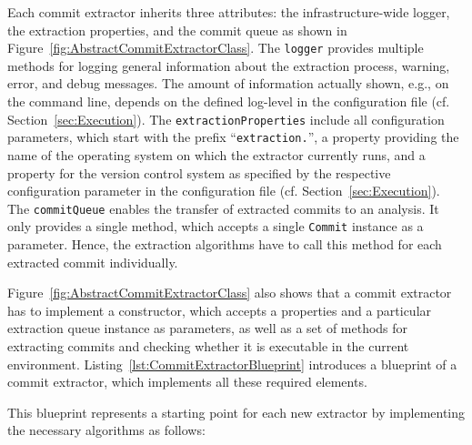 Each commit extractor inherits three attributes: the infrastructure-wide logger, the extraction properties, and the commit queue as shown in Figure~\ref{fig:AbstractCommitExtractorClass}. The \texttt{logger} provides multiple methods for logging general information about the extraction process, warning, error, and debug messages. The amount of information actually shown, e.g., on the command line, depends on the defined log-level in the configuration file (cf. Section~\ref{sec:Execution}). The \texttt{extractionProperties} include all configuration parameters, which start with the prefix ``\texttt{extraction.}'', a property providing the name of the operating system on which the extractor currently runs, and a property for the version control system as specified by the respective configuration parameter in the configuration file (cf. Section~\ref{sec:Execution}). The \texttt{commitQueue} enables the transfer of extracted commits to an analysis. It only provides a single method, which accepts a single \texttt{Commit} instance as a parameter. Hence, the extraction algorithms have to call this method for each extracted commit individually.

Figure~\ref{fig:AbstractCommitExtractorClass} also shows that a commit extractor has to implement a constructor, which accepts a properties and a particular extraction queue instance as parameters, as well as a set of methods for extracting commits and checking whether it is executable in the current environment. Listing~\ref{lst:CommitExtractorBlueprint} introduces a blueprint of a commit extractor, which implements all these required elements.

\begin{figure}[ht]
	\centering
		
\end{figure}

This blueprint represents a starting point for each new extractor by implementing the necessary algorithms as follows:

